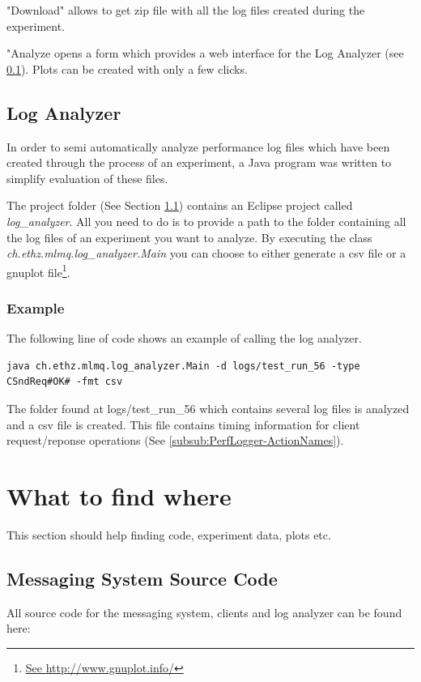 \documentclass[a4paper]{article}
\begin{document}
"Download" allows to get zip file with all the log files created during the experiment.

"Analyze opens a form which provides a web interface for the Log Analyzer (see \ref{subsec:LogAnalyzer}). Plots can be created with only a few clicks.

\subsection{Log Analyzer}
\label{subsec:LogAnalyzer}

In order to semi automatically analyze performance log files which have been created through the process of an experiment, a Java program was written to simplify evaluation of these files.

The project folder (See Section \ref{sec:WhereToFind:MessagingSystemSrc}) contains an Eclipse project called \textit{log\_analyzer}. All you need to do is to provide a path to the folder containing all the log files of an experiment you want to analyze. By executing the class \textit{ch.ethz.mlmq.log\_analyzer.Main} you can choose to either generate a csv file or a gnuplot file\footnote{\url{See http://www.gnuplot.info/}}.


\subsubsection{Example}
The following line of code shows an example of calling the log analyzer.

\begin{verbatim}
java ch.ethz.mlmq.log_analyzer.Main -d logs/test_run_56 -type CSndReq#OK# -fmt csv
\end{verbatim}

The folder found at logs/test\_run\_56 which contains several log files is analyzed and a csv file is created. This file contains timing information for client request/reponse operations (See \ref{subsub:PerfLogger-ActionNames}).

\pagebreak

\section{What to find where}

This section should help finding code, experiment data, plots etc.

\subsection{Messaging System Source Code}
\label{sec:WhereToFind:MessagingSystemSrc}
All source code for the messaging system, clients and log analyzer can be found here:
\end{document}
